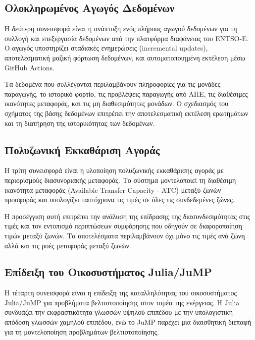 \subsection{Ολοκληρωμένος Αγωγός Δεδομένων}
\label{subsec:data-pipeline-contribution}

Η δεύτερη συνεισφορά είναι η ανάπτυξη ενός πλήρους αγωγού δεδομένων για τη συλλογή και επεξεργασία δεδομένων από την πλατφόρμα διαφάνειας του ENTSO-E. Ο αγωγός υποστηρίζει σταδιακές ενημερώσεις (incremental updates), αποτελεσματική μαζική φόρτωση δεδομένων, και αυτοματοποιημένη εκτέλεση μέσω GitHub Actions.

Τα δεδομένα που συλλέγονται περιλαμβάνουν πληροφορίες για τις μονάδες παραγωγής, το ιστορικό φορτίο, τις προβλέψεις παραγωγής από ΑΠΕ, τις διαθέσιμες ικανότητες μεταφοράς, και τις μη διαθεσιμότητες μονάδων. Ο σχεδιασμός του σχήματος της βάσης δεδομένων επιτρέπει την αποτελεσματική εκτέλεση ερωτημάτων και τη διατήρηση της ιστορικότητας των δεδομένων.

\subsection{Πολυζωνική Εκκαθάριση Αγοράς}
\label{subsec:multizone-contribution}

Η τρίτη συνεισφορά είναι η υλοποίηση πολυζωνικής εκκαθάρισης αγοράς με περιορισμούς διασυνοριακής μεταφοράς. Το σύστημα μοντελοποιεί τη διαθέσιμη ικανότητα μεταφοράς (Available Transfer Capacity - ATC) μεταξύ ζωνών προσφοράς και υπολογίζει ταυτόχρονα τις τιμές σε όλες τις συνδεδεμένες ζώνες.

Η προσέγγιση αυτή επιτρέπει την ανάλυση της επίδρασης της διασυνδεσιμότητας στις τιμές και τον εντοπισμό περιπτώσεων συμφόρησης που οδηγούν σε διαφοροποίηση τιμών μεταξύ ζωνών. Τα αποτελέσματα περιλαμβάνουν όχι μόνο τις τιμές ανά ζώνη αλλά και τις ροές μεταφοράς μεταξύ ζωνών.

\subsection{Επίδειξη του Οικοσυστήματος Julia/JuMP}
\label{subsec:julia-contribution}

Η τέταρτη συνεισφορά είναι η επίδειξη της καταλληλότητας του οικοσυστήματος Julia/JuMP για προβλήματα βελτιστοποίησης στον τομέα της ενέργειας. Η Julia συνδυάζει την εκφραστικότητα γλωσσών υψηλού επιπέδου με την υπολογιστική απόδοση γλωσσών χαμηλού επιπέδου, ενώ το JuMP παρέχει μια διαισθητική διεπαφή για τη μοντελοποίηση προβλημάτων βελτιστοποίησης.

